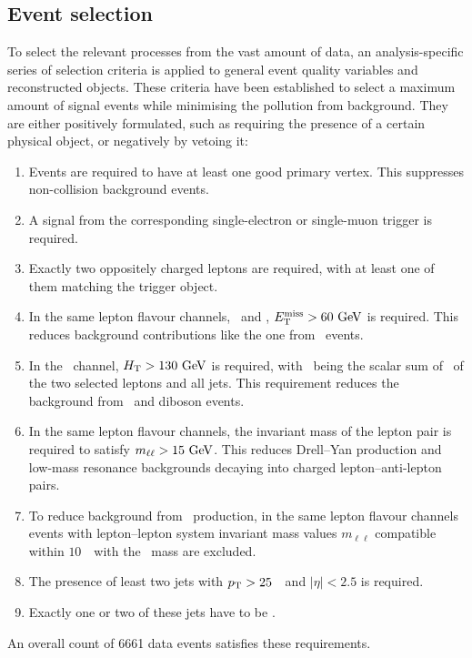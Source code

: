 \subsection{Event selection}
\label{sect:evsel7TeV}
To select the relevant processes from the vast amount of data, an analysis-specific series of selection criteria is applied to general event quality variables and reconstructed objects. 
%
These criteria have been established to select a maximum amount of signal events while minimising the pollution from background. 
%
They are either positively formulated, such as requiring the presence of a certain physical object, or negatively by vetoing it:
%
\begin{enumerate}
\item Events are required to have at least one good primary vertex. 
%
This suppresses non-collision background events.
\item A signal from the corresponding single-electron or single-muon trigger is required.
\item Exactly two oppositely charged leptons are required, with at least one of them matching the trigger object.
\item In the same lepton flavour channels, \ee\ and \mumu, $E_\mathrm{T}^\mathrm{miss}>60~\mathrm{GeV}$ is required. This reduces background contributions like the one from \Zj\ events.
\item In the \emu\ channel, $H_{\mathrm{T}}>130~\mathrm{GeV}$ is required, with \Ht\ being the scalar sum of \pt\ of the two selected leptons and all jets. This requirement reduces the background from \Zj\ and diboson events.
\item In the same lepton flavour channels, the invariant mass of the lepton pair is required to satisfy $m_{\ell\ell} > 15~\mathrm{GeV}$. 
%
This reduces Drell--Yan production and low-mass resonance backgrounds decaying into charged lepton--anti-lepton pairs.
\item  To reduce background from \Zboson\ production, in the same lepton flavour channels events with lepton--lepton system invariant mass values $m_{\ell\ell}$ compatible within $10$~\GeV\ with the \Zboson\ mass are excluded.
\item The presence of least two jets with $p_\mathrm{T}>25$~\GeV\ and $\vert\eta\vert<2.5$ is required.
\item Exactly one or two of these jets have to be \btagged.
\end{enumerate}

An overall count of 6661 data events satisfies these requirements. 
















